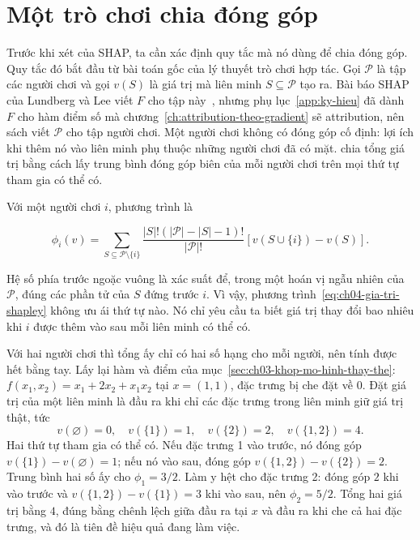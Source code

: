 \section{Một trò chơi chia đóng góp}
\label{sec:ch04-tro-choi-chia-gia-tri}

%
Trước khi xét  của SHAP, ta cần xác
định quy tắc mà nó dùng để
chia đóng góp. Quy tắc đó bắt đầu từ bài toán gốc của lý thuyết trò chơi hợp
tác. Gọi $\mathcal{P}$ là tập các người chơi và gọi $v(S)$ là giá trị mà liên
minh $S \subseteq \mathcal{P}$ tạo ra. Bài báo SHAP của Lundberg và Lee viết
$F$ cho tập này~\autocite{p10shap}, nhưng phụ lục~\ref{app:ky-hieu} đã dành
$F$ cho hàm điểm số mà chương~\ref{ch:attribution-theo-gradient} sẽ
attribution, nên sách viết $\mathcal{P}$ cho tập người chơi.
Một người chơi không có đóng góp cố định: lợi ích khi thêm nó vào liên
minh phụ thuộc những người chơi đã có mặt. 
chia tổng giá trị bằng cách lấy trung bình đóng góp biên của mỗi người chơi
trên mọi thứ tự tham gia có thể có.

Với một người chơi $i$, phương trình là

\begin{equation}
\label{eq:ch04-gia-tri-shapley}
\phi_i(v)=
\sum_{S \subseteq \mathcal{P} \setminus \{i\}}
\frac{|S|!(|\mathcal{P}|-|S|-1)!}{|\mathcal{P}|!}
\left[v(S\cup\{i\})-v(S)\right].
\end{equation}

Hệ số phía trước ngoặc vuông là xác suất để, trong một hoán vị ngẫu nhiên của
$\mathcal{P}$, đúng các phần tử của $S$ đứng trước $i$. Vì vậy,
phương trình~\ref{eq:ch04-gia-tri-shapley} không ưu ái thứ tự nào. Nó chỉ yêu cầu ta biết
giá trị thay đổi bao nhiêu khi $i$ được thêm vào sau mỗi liên minh có thể có.

Với hai người chơi thì tổng ấy chỉ có hai số hạng cho mỗi người, nên tính được
hết bằng tay. Lấy lại hàm và điểm của
mục~\ref{sec:ch03-khop-mo-hinh-thay-the}: $f(x_1,x_2) = x_1 + 2x_2 + x_1x_2$ tại
$x = (1,1)$, đặc trưng bị che đặt về 0. Đặt giá trị của một liên minh là đầu ra
khi chỉ các đặc trưng trong liên minh giữ giá trị thật, tức
\[
  v(\varnothing) = 0, \quad v(\{1\}) = 1, \quad v(\{2\}) = 2,
  \quad v(\{1,2\}) = 4 .
\]
Hai thứ tự tham gia có thể có. Nếu đặc trưng 1 vào trước, nó đóng góp
$v(\{1\}) - v(\varnothing) = 1$; nếu nó vào sau, đóng góp
$v(\{1,2\}) - v(\{2\}) = 2$. Trung bình hai số ấy cho $\phi_1 = 3/2$. Làm y hệt
cho đặc trưng 2: đóng góp $2$ khi vào trước và $v(\{1,2\}) - v(\{1\}) = 3$ khi
vào sau, nên $\phi_2 = 5/2$. Tổng hai giá trị bằng $4$, đúng bằng chênh lệch
giữa đầu ra tại $x$ và đầu ra khi che cả hai đặc trưng, và đó là tiên đề hiệu
quả đang làm việc.

